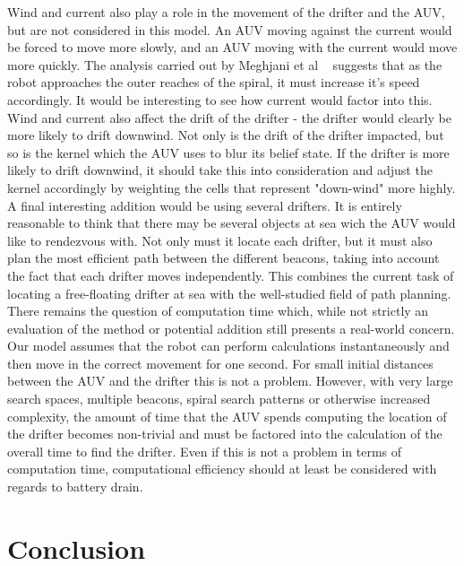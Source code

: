\documentclass[a4paper, 11pt]{article} %
\begin{document}
\noindent Wind and current also play a role in the movement of the drifter and the AUV, but are not considered in this model. An AUV moving against the current would be forced to move more slowly, and an AUV moving with the current would move more quickly. The analysis carried out by Meghjani et al ~\cite{meghjani14} suggests that as the robot approaches the outer reaches of the spiral, it must increase it's speed accordingly. It would be interesting to see how current would factor into this. Wind and current also affect the drift of the drifter - the drifter would clearly be more likely to drift downwind. Not only is the drift of the drifter impacted, but so is the kernel which the AUV uses to blur its belief state. If the drifter is more likely to drift downwind, it should take this into consideration and adjust the kernel accordingly by weighting the cells that represent "down-wind" more highly.\\ 

\noindent A final interesting addition would be using several drifters. It is entirely reasonable to think that there may be several objects at sea wich the AUV would like to rendezvous with. Not only must it locate each drifter, but it must also plan the most efficient path between the different beacons, taking into account the fact that each drifter moves independently. This combines the current task of locating a free-floating drifter at sea with the well-studied field of path planning. \\
  
\noindent There remains the question of computation time which, while not strictly an evaluation of the method or potential addition still presents a real-world concern. Our model assumes that the robot can perform calculations instantaneously and then move in the correct movement for one second. For small initial distances between the AUV and the drifter this is not a problem. However, with very large search spaces, multiple beacons, spiral search patterns or otherwise increased complexity, the amount of time that the AUV spends computing the location of the drifter becomes non-trivial and must be factored into the calculation of the overall time to find the drifter. Even if this is not a problem in terms of computation time, computational efficiency should at least be considered with regards to battery drain.



\section*{Conclusion}
\end{document}
